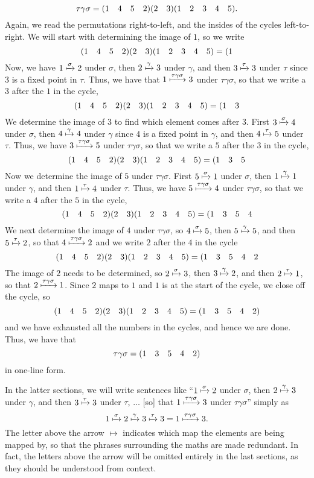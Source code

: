 \begin{example}
    \[
    \tau\gamma\sigma = (1 \quad 4 \quad 5 \quad 2)(2 \quad 3)(1 \quad 2 \quad 3 \quad 4 \quad 5).
    \]
    Again, we read the permutations right-to-left, and the insides of the cycles left-to-right. We will start with determining the image of $1$, so we write
    \[
    (1 \quad 4 \quad 5 \quad 2)(2 \quad 3)(1 \quad 2 \quad 3 \quad 4 \quad 5) = (1
    \]
    Now, we have $1 \xmapsto{\sigma} 2$ under $\sigma$, then $2 \xmapsto{\gamma} 3$ under $\gamma$, and then $3 \xmapsto{\tau} 3$ under $\tau$ since $3$ is a fixed point in $\tau$. Thus, we have that $1 \xmapsto{\tau\gamma\sigma} 3$ under $\tau\gamma\sigma$, so that we write a $3$ after the $1$ in the cycle,
    \[
    (1 \quad 4 \quad 5 \quad 2)(2 \quad 3)(1 \quad 2 \quad 3 \quad 4 \quad 5) = (1 \quad 3
    \]
    We determine the image of $3$ to find which element comes after $3$. First $3 \xmapsto{\sigma} 4$ under $\sigma$, then $4 \xmapsto{\gamma} 4$ under $\gamma$ since $4$ is a fixed point in $\gamma$, and then $4 \xmapsto{\tau} 5$ under $\tau$. Thus, we have $3 \xmapsto{\tau\gamma\sigma} 5$ under $\tau\gamma\sigma$, so that we write a $5$ after the $3$ in the cycle,
    \[
    (1 \quad 4 \quad 5 \quad 2)(2 \quad 3)(1 \quad 2 \quad 3 \quad 4 \quad 5) = (1 \quad 3 \quad 5
    \]
    Now we determine the image of $5$ under $\tau\gamma\sigma$. First $5 \xmapsto{\sigma} 1$ under $\sigma$, then $1 \xmapsto{\gamma} 1$ under $\gamma$, and then $1 \xmapsto{\tau} 4$ under $\tau$. Thus, we have $5 \xmapsto{\tau\gamma\sigma} 4$ under $\tau\gamma\sigma$, so that we write a $4$ after the $5$ in the cycle,
    \[
    (1 \quad 4 \quad 5 \quad 2)(2 \quad 3)(1 \quad 2 \quad 3 \quad 4 \quad 5) = (1 \quad 3 \quad 5 \quad 4
    \]
    We next determine the image of $4$ under $\tau\gamma\sigma$, so $4 \xmapsto{\sigma} 5$, then $5 \xmapsto{\gamma} 5$, and then $5 \xmapsto{\tau} 2$, so that $4 \xmapsto{\tau\gamma\sigma} 2$ and we write $2$ after the $4$ in the cycle
    \[
    (1 \quad 4 \quad 5 \quad 2)(2 \quad 3)(1 \quad 2 \quad 3 \quad 4 \quad 5) = (1 \quad 3 \quad 5 \quad 4 \quad 2
    \]
    The image of $2$ needs to be determined, so $2 \xmapsto{\sigma} 3$, then $3 \xmapsto{\gamma} 2$, and then $2 \xmapsto{\tau} 1$, so that $2 \xmapsto{\tau\gamma\sigma} 1$. Since $2$ maps to $1$ and $1$ is at the start of the cycle, we close off the cycle, so
    \[
    (1 \quad 4 \quad 5 \quad 2)(2 \quad 3)(1 \quad 2 \quad 3 \quad 4 \quad 5) = (1 \quad 3 \quad 5 \quad 4 \quad 2)
    \]
    and we have exhausted all the numbers in the cycles, and hence we are done. Thus, we have that
    \[
    \tau\gamma\sigma = (1 \quad 3 \quad 5 \quad 4 \quad 2)
    \]
    in one-line form.
\end{example}

In the latter sections, we will write sentences like ``$1 \xmapsto{\sigma} 2$ under $\sigma$, then $2 \xmapsto{\gamma} 3$ under $\gamma$, and then $3 \xmapsto{\tau} 3$ under $\tau$, $\ldots$ [so] that $1 \xmapsto{\tau\gamma\sigma} 3$ under $\tau\gamma\sigma$'' simply as
\[
1 \xmapsto{\sigma} 2 \xmapsto{\gamma} 3 \xmapsto{\tau} 3 = 1 \xmapsto{\tau\gamma\sigma} 3.
\]
The letter above the arrow $\mapsto$ indicates which map the elements are being mapped by, so that the phrases surrounding the maths are made redundant. In fact, the letters above the arrow will be omitted entirely in the last sections, as they should be understood from context.

